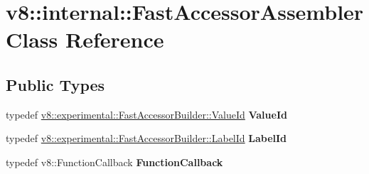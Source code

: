 \hypertarget{classv8_1_1internal_1_1_fast_accessor_assembler}{}\section{v8\+:\+:internal\+:\+:Fast\+Accessor\+Assembler Class Reference}
\label{classv8_1_1internal_1_1_fast_accessor_assembler}
\subsection*{Public Types}
\begin{DoxyCompactItemize}
\item 
typedef \hyperlink{structv8_1_1experimental_1_1_fast_accessor_builder_1_1_value_id}{v8\+::experimental\+::\+Fast\+Accessor\+Builder\+::\+Value\+Id} {\bfseries Value\+Id}\hypertarget{classv8_1_1internal_1_1_fast_accessor_assembler_aefc68c9be7ba9f185d4726981ba0ff97}{}\label{classv8_1_1internal_1_1_fast_accessor_assembler_aefc68c9be7ba9f185d4726981ba0ff97}

\item 
typedef \hyperlink{structv8_1_1experimental_1_1_fast_accessor_builder_1_1_label_id}{v8\+::experimental\+::\+Fast\+Accessor\+Builder\+::\+Label\+Id} {\bfseries Label\+Id}\hypertarget{classv8_1_1internal_1_1_fast_accessor_assembler_a803b9341ecb6ef956bcec6a99f2714a0}{}\label{classv8_1_1internal_1_1_fast_accessor_assembler_a803b9341ecb6ef956bcec6a99f2714a0}

\item 
typedef v8\+::\+Function\+Callback {\bfseries Function\+Callback}\hypertarget{classv8_1_1internal_1_1_fast_accessor_assembler_a808bb0e8bc6836f24263e256bba2ffad}{}\label{classv8_1_1internal_1_1_fast_accessor_assembler_a808bb0e8bc6836f24263e256bba2ffad}

\end{DoxyCompactItemize}
